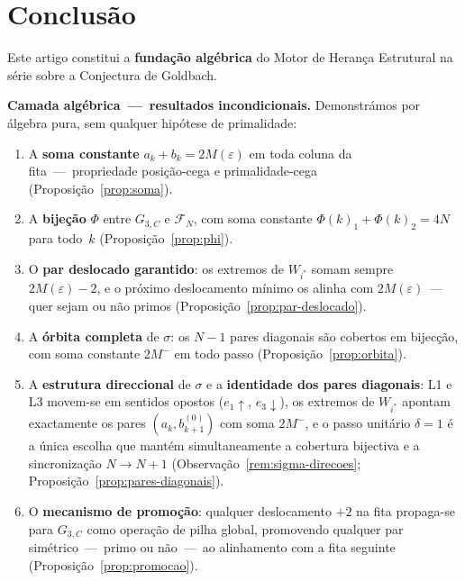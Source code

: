 \documentclass[12pt, a4paper]{article}
\theoremstyle{plain}
\theoremstyle{definition}
\theoremstyle{remark}
\begin{document}
	\section{Conclusão}
	\label{sec:conclusao}
	
	Este artigo constitui a \textbf{fundação algébrica} do Motor de
	Herança Estrutural na série sobre a Conjectura de Goldbach.
	
	\medskip
	\noindent\textbf{Camada algébrica~---~resultados incondicionais.}
	Demonstrámos por álgebra pura, sem qualquer hipótese de primalidade:
	\begin{enumerate}
		\item A \textbf{soma constante} $a_k+b_k=2M(\varepsilon)$ em
		toda coluna da fita~---~propriedade posição-cega e
		primalidade-cega (Proposição~\ref{prop:soma}).
		\item A \textbf{bijeção} $\Phi$ entre $G_{3,C}$ e
		$\mathcal{F}_N$, com soma constante $\Phi(k)_1+\Phi(k)_2
		=4N$ para todo~$k$ (Proposição~\ref{prop:phi}).
		\item O \textbf{par deslocado garantido}: os extremos de
		$W_{i^*}$ somam sempre $2M(\varepsilon)-2$, e o próximo
		deslocamento mínimo os alinha com $2M(\varepsilon)$~---~
		quer sejam ou não primos
		(Proposição~\ref{prop:par-deslocado}).
		\item A \textbf{órbita completa} de $\sigma$: os $N-1$ pares
		diagonais são cobertos em bijecção, com soma constante
		$2M^-$ em todo passo (Proposição~\ref{prop:orbita}).
		\item A \textbf{estrutura direccional} de $\sigma$ e a
		\textbf{identidade dos pares diagonais}: L1 e L3
		movem-se em sentidos opostos ($e_1\!\uparrow$,
		$e_3\!\downarrow$), os extremos de $W_{i^*}$ apontam
		exactamente os pares $(a_k,b_{k+1}^{(0)})$ com soma
		$2M^-$, e o passo unitário $\delta=1$ é a única escolha
		que mantém simultaneamente a cobertura bijectiva e a
		sincronização $N\to N{+}1$
		(Observação~\ref{rem:sigma-direcoes};
		Proposição~\ref{prop:pares-diagonais}).
		\item O \textbf{mecanismo de promoção}: qualquer deslocamento
		$+2$ na fita propaga-se para $G_{3,C}$ como operação de
		pilha global, promovendo qualquer par simétrico~---~primo
		ou não~---~ao alinhamento com a fita seguinte
		(Proposição~\ref{prop:promocao}).
	\end{enumerate}
	
\end{document}
